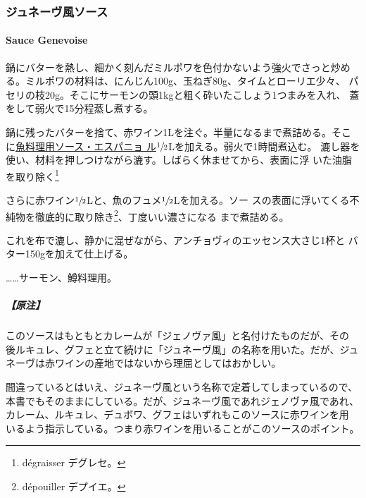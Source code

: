 \documentclass[twoside,12Q,b5j]{escoffierltjsbook}
\renewcommand{\ldots}{…}
\newenvironment{recette}{\begin{small}\begin{spacing}{1}\begin{multicols}{2}}{\end{multicols}\end{spacing}\end{small}}
\begin{document}
\begin{recette}
\subsubsection{ジュネーヴ風ソース}\label{ux30b8ux30e5ux30cdux30fcux30f4ux98a8ux30bdux30fcux30b9}

\paragraph{Sauce Genevoise}\label{sauce-genevoise}


鍋にバターを熱し、細かく刻んだミルポワを色付かないよう強火でさっと炒め
る。ミルポワの材料は、にんじん100g、玉ねぎ80g、タイムとローリエ少々、
パセリの枝20g。そこにサーモンの頭1kgと粗く砕いたこしょう1つまみを入れ、
蓋をして弱火で15分程蒸し煮する。

鍋に残ったバターを捨て、赤ワイン1Lを注ぐ。半量になるまで煮詰める。そこ
に\protect\hyperlink{sauce-espagnole-maigre}{魚料理用ソース・エスパニョ
ル}\(\sfrac{1}{2}\)Lを加える。弱火で1時間煮込む。
漉し器を使い、材料を押しつけながら漉す。しばらく休ませてから、表面に浮
いた油脂を取り除く\footnote{dégraisser デグレセ。}

さらに赤ワイン\(\sfrac{1}{2}\)Lと、魚のフュメ\(\sfrac{1}{2}\)Lを加える。ソー
スの表面に浮いてくる不純物を徹底的に取り除き\footnote{dépouiller
  デプイエ。}、丁度いい濃さになる まで煮詰める。

これを布で漉し、静かに混ぜながら、アンチョヴィのエッセンス大さじ1杯と
バター150gを加えて仕上げる。

\ldots{}\ldots{}サーモン、鱒料理用。

\subparagraph{【原注】}\label{ux539fux6ce8-2}

このソースはもともとカレームが「ジェノヴァ風」と名付けたものだが、その
後ルキュレ、グフェと立て続けに「ジュネーヴ風」の名称を用いた。だが、ジュ
ネーヴは赤ワインの産地ではないから理屈としてはおかしい。

間違っているとはいえ、ジュネーヴ風という名称で定着してしまっているので、
本書でもそのままにしている。だが、ジュネーヴ風であれジェノヴァ風であれ、
カレーム、ルキュレ、デュボワ、グフェはいずれもこのソースに赤ワインを用
いるよう指示している。つまり赤ワインを用いることがこのソースのポイント。

\vspace*{1.7\zw}


\end{recette}
\end{document}
